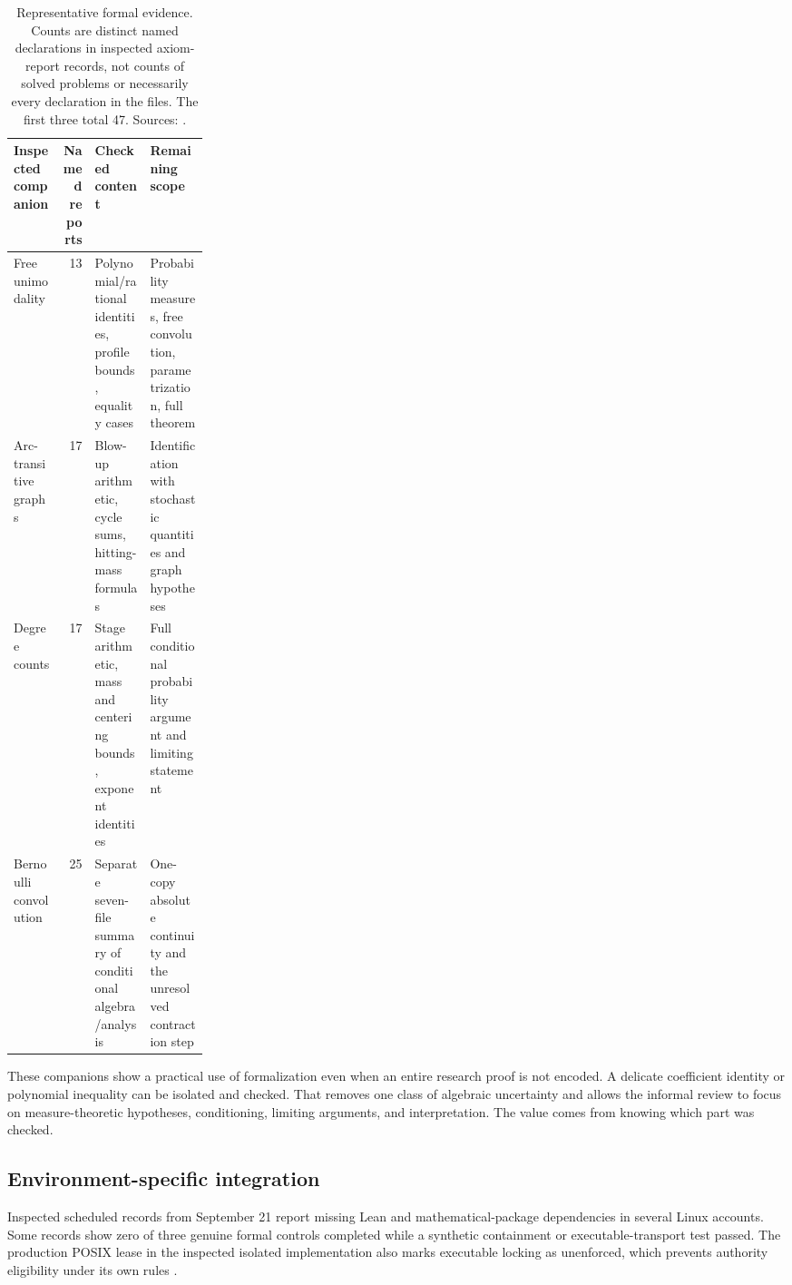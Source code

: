 \begin{table}[htbp]
\centering\small
\begin{tabularx}{\linewidth}{p{0.25\linewidth}rYY}
\toprule
Inspected companion & Named reports & Checked content & Remaining scope\\
\midrule
Free unimodality & 13 & Polynomial/rational identities, profile bounds, equality cases & Probability measures, free convolution, parametrization, full theorem\\
Arc-transitive graphs & 17 & Blow-up arithmetic, cycle sums, hitting-mass formulas & Identification with stochastic quantities and graph hypotheses\\
Degree counts & 17 & Stage arithmetic, mass and centering bounds, exponent identities & Full conditional probability argument and limiting statement\\
Bernoulli convolution & 25 & Separate seven-file summary of conditional algebra/analysis & One-copy absolute continuity and the unresolved contraction step\\
\bottomrule
\end{tabularx}
\caption{Representative formal evidence. Counts are distinct named declarations in inspected axiom-report records, not counts of solved problems or necessarily every declaration in the files. The first three total 47. Sources: \citep{freelean,arclean,degreelean,bc23lean}.}
\label{tab:lean}
\end{table}

These companions show a practical use of formalization even when an entire research proof is not encoded. A delicate coefficient identity or polynomial inequality can be isolated and checked. That removes one class of algebraic uncertainty and allows the informal review to focus on measure-theoretic hypotheses, conditioning, limiting arguments, and interpretation. The value comes from knowing which part was checked.

\subsection{Environment-specific integration}

Inspected scheduled records from September 21 report missing Lean and mathematical-package dependencies in several Linux accounts. Some records show zero of three genuine formal controls completed while a synthetic containment or executable-transport test passed. The production POSIX lease in the inspected isolated implementation also marks executable locking as unenforced, which prevents authority eligibility under its own rules \citep{leanblocked,leanimplementation}.

